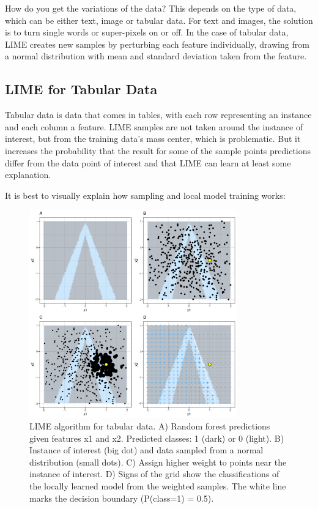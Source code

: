 \documentclass[
  11pt,
]{scrbook}
\begin{document}
How do you get the variations of the data?
This depends on the type of data, which can be either text, image or tabular data.
For text and images, the solution is to turn single words or super-pixels on or off.
In the case of tabular data, LIME creates new samples by perturbing each feature individually, drawing from a normal distribution with mean and standard deviation taken from the feature.

\hypertarget{lime-for-tabular-data}{%
\subsection{LIME for Tabular Data}\label{lime-for-tabular-data}}

Tabular data is data that comes in tables, with each row representing an instance and each column a feature.
LIME samples are not taken around the instance of interest, but from the training data's mass center, which is problematic.
But it increases the probability that the result for some of the sample points predictions differ from the data point of interest and that LIME can learn at least some explanation.

It is best to visually explain how sampling and local model training works:

\begin{figure}

{\centering \includegraphics[width=0.8\textwidth]{images/lime-fitting-1} 

}

\caption{LIME algorithm for tabular data. A) Random forest predictions given features x1 and x2. Predicted classes: 1 (dark) or 0 (light). B) Instance of interest (big dot) and data sampled from a normal distribution (small dots). C) Assign higher weight to points near the instance of interest. D) Signs of the grid show the classifications of the locally learned model from the weighted samples. The white line marks the decision boundary (P(class=1) = 0.5).}\label{fig:lime-fitting}
\end{figure}
\end{document}
